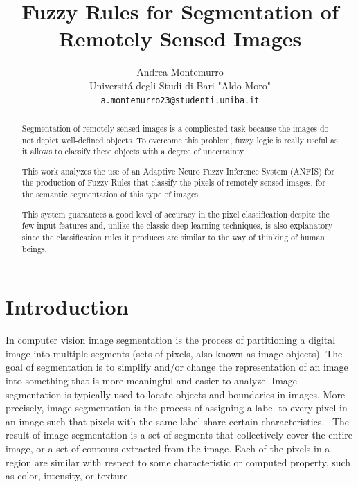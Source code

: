 \documentclass[10pt,twocolumn,letterpaper]{article}
\begin{document}
\title{Fuzzy Rules for Segmentation of Remotely Sensed Images}

\author{Andrea Montemurro\\
Universitá degli Studi di Bari "Aldo Moro"\\
{\tt\small a.montemurro23@studenti.uniba.it}

}

\maketitle

\begin{abstract}
Segmentation of remotely sensed images is a complicated task because the images do not depict well-defined objects.
To overcome this problem, fuzzy logic is really useful as it allows to classify these objects with a degree of uncertainty.

This work analyzes the use of an Adaptive Neuro Fuzzy Inference System (ANFIS) for the production of Fuzzy Rules that classify the pixels of remotely sensed images, for the semantic segmentation of this type of images.

This system guarantees a good level of accuracy in the pixel classification despite the few input features and, unlike the classic deep learning techniques, is also explanatory since the classification rules it produces are similar to the way of thinking of human beings.
\end{abstract}

\section{Introduction}

In computer vision image segmentation is the process of partitioning a digital image into multiple segments (sets of pixels, also known as image objects). The goal of segmentation is to simplify and/or change the representation of an image into something that is more meaningful and easier to analyze. Image segmentation is typically used to locate objects and boundaries in images. More precisely, image segmentation is the process of assigning a label to every pixel in an image such that pixels with the same label share certain characteristics.~\cite{segmentation} The result of image segmentation is a set of segments that collectively cover the entire image, or a set of contours extracted from the image. Each of the pixels in a region are similar with respect to some characteristic or computed property, such as color, intensity, or texture.
\end{document}
